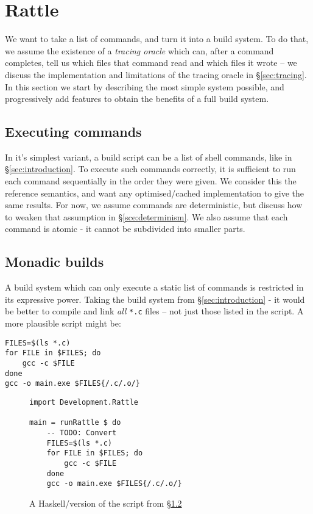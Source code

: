 \section{Rattle}
\label{sec:rattle}

We want to take a list of commands, and turn it into a build system. To do that, we assume the existence of a \emph{tracing oracle} which can, after a command completes, tell us which files that command read and which files it wrote -- we discuss the implementation and limitations of the tracing oracle in \S\ref{sec:tracing}. In this section we start by describing the most simple system possible, and progressively add features to obtain the benefits of a full build system.

\subsection{Executing commands}

In it's simplest variant, a build script can be a list of shell commands, like in \S\ref{sec:introduction}. To execute such commands correctly, it is sufficient to run each command sequentially in the order they were given. We consider this the reference semantics, and want any optimised/cached implementation to give the same results. For now, we assume commands are deterministic, but discuss how to weaken that assumption in \S\ref{sce:determinism}. We also assume that each command is atomic - it cannot be subdivided into smaller parts.

\subsection{Monadic builds}
\label{sec:monadic}

A build system which can only execute a static list of commands is restricted in its expressive power. Taking the build system from \S\ref{sec:introduction} - it would be better to compile and link \emph{all} \texttt{*.c} files -- not just those listed in the script. A more plausible script might be:

\begin{verbatim}
FILES=$(ls *.c)
for FILE in $FILES; do
    gcc -c $FILE
done
gcc -o main.exe $FILES{/.c/.o/}
\end{verbatim}

\begin{figure}
\begin{verbatim}
import Development.Rattle

main = runRattle $ do
    -- TODO: Convert
    FILES=$(ls *.c)
    for FILE in $FILES; do
        gcc -c $FILE
    done
    gcc -o main.exe $FILES{/.c/.o/}
\end{verbatim}
\caption{A Haskell/\Rattle version of the script from \S\ref{sec:monadic}}
\label{fig:monadic}
\end{figure}

